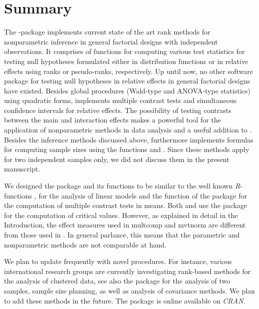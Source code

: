 \section{Summary} \label{sec:summary}
The -package implements current state of the art rank methods for nonparametric
inference in general factorial designs with independent observations. It comprises of functions for computing various test statistics for testing null hypotheses formulated either in distribution functions
or in relative effects using ranks or  pseudo-ranks, respectively. Up until now, no other software package for testing null hypotheses in relative effects in general factorial designs have existed.  Besides global procedures (Wald-type and ANOVA-type statistics) using quadratic forms,  implements multiple contrast tests  and simultaneous confidence intervals for relative effects. The possibility of testing contrasts between the main and interaction effects makes  a powerful tool for the application of nonparametric methods in data analysis and a useful addition to  \citep{konietschke2015nparcomp}. Besides the inference methods discussed above,  furthermore implements formulas for computing sample sizes using the functions  and  \citep{happ2019optimal}. Since these methods apply for two independent samples only, we did not discuss them in the present manuscript. %

We designed the package and its functions to be similar to the well known \textit{R}-functions ,  for the analysis of linear models and the  function of the  package for the computation of multiple contrast tests in means. Both  and  use the  package \citep{genz2021package} for the computation of critical values. However, as explained in detail in the Introduction, the effect measures used in multcomp and mvtnorm are different from those used in . In general parlance, this means that the parametric and nonparametric methods are not comparable at hand. 

  
We plan to update  frequently with novel procedures. For instance, various international research groups are currently investigating rank-based methods for the analysis of clustered data, see also the package  \cite{jiang2017wilcoxon} for the analysis of two samples, sample size planning, as well as analysis of covariance methods. We plan to add these methods in the future. The package  is online available
on \textit{CRAN}. \\


